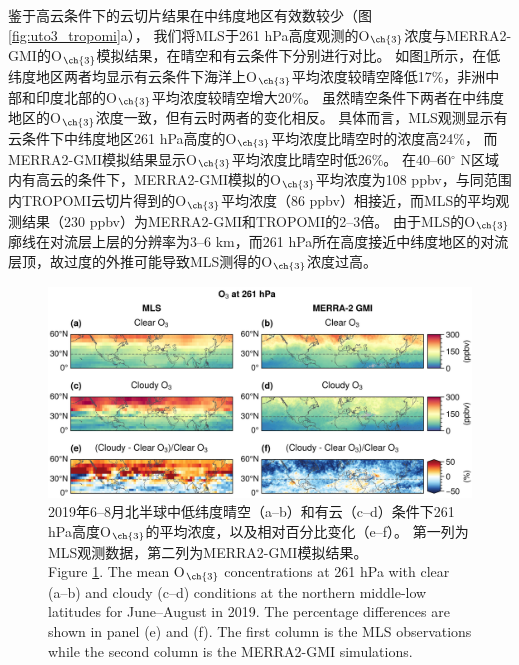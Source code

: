 鉴于高云条件下的云切片结果在中纬度地区有效数较少（图\ref{fig:uto3_tropomi}a），
我们将MLS于261 hPa高度观测的O$_{\ch{3}}$浓度与MERRA2-GMI的O$_{\ch{3}}$模拟结果，在晴空和有云条件下分别进行对比。
如图\ref{fig:mls_o3_261hpa}所示，在低纬度地区两者均显示有云条件下海洋上O$_{\ch{3}}$平均浓度较晴空降低17\%，非洲中部和印度北部的O$_{\ch{3}}$平均浓度较晴空增大20\%。
虽然晴空条件下两者在中纬度地区的O$_{\ch{3}}$浓度一致，但有云时两者的变化相反。
具体而言，MLS观测显示有云条件下中纬度地区261 hPa高度的O$_{\ch{3}}$平均浓度比晴空时的浓度高24\%，
而MERRA2-GMI模拟结果显示O$_{\ch{3}}$平均浓度比晴空时低26\%。
在40--60$^{\circ}$ N区域内有高云的条件下，MERRA2-GMI模拟的O$_{\ch{3}}$平均浓度为108 ppbv，与同范围内TROPOMI云切片得到的O$_{\ch{3}}$平均浓度（86 ppbv）相接近，而MLS的平均观测结果（230 ppbv）为MERRA2-GMI和TROPOMI的2--3倍。
由于MLS的O$_{\ch{3}}$廓线在对流层上层的分辨率为3--6 km，而261 hPa所在高度接近中纬度地区的对流层顶，故过度的外推可能导致MLS测得的O$_{\ch{3}}$浓度过高\citep{Schoeberl.2007}。


\begin{figure}[H]
    \centering
    \includegraphics[width=\textwidth]{./figures/mls_o3_261hpa.png}
    \caption{
    2019年6--8月北半球中低纬度晴空（a--b）和有云（c--d）条件下261 hPa高度O$_{\ch{3}}$的平均浓度，以及相对百分比变化（e--f）。
    第一列为MLS观测数据，第二列为MERRA2-GMI模拟结果。 \\
    Figure \ref{fig:mls_o3_261hpa}. The mean O$_{\ch{3}}$ concentrations at 261 hPa with clear (a--b) and cloudy (c--d) conditions at the northern middle-low latitudes for June--August in 2019. The percentage differences are shown in panel (e) and (f).
    The first column is the MLS observations while the second column is the MERRA2-GMI simulations.
    }
    \label{fig:mls_o3_261hpa}
\end{figure}


